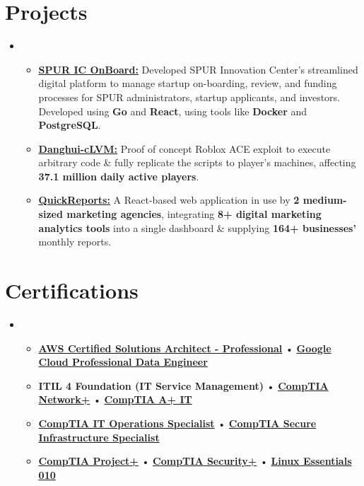 \documentclass[letterpaper,11pt]{article}
\newcommand{\cvitem}[1]{
  \item\small{
    {#1\vspace{-2pt}}
  }
}
\newcommand{\cvheadingstart}{\begin{itemize}[leftmargin=0in, label={}]}
\newcommand{\cvheadingend}{\end{itemize}}
\newcommand{\cvitemstart}{\begin{itemize}\justifying}
\newcommand{\cvitemend}{\end{itemize}\vspace{-5pt}}
\begin{document}
\section{Projects}
\cvheadingstart
\item
\cvitemstart
  \cvitem{\textbf{\href{https://github.com/KonferCA/SPUR}{SPUR IC OnBoard:}} Developed SPUR Innovation Center's streamlined digital platform to manage startup on-boarding, review, and funding processes for SPUR administrators, startup applicants, and investors. Developed using \textbf{Go} and \textbf{React}, using tools like \textbf{Docker} and \textbf{PostgreSQL}.}
  \vspace{6pt}
  \cvitem{\textbf{\href{https://github.com/AmirAgassi/Danghui-LVM}{Danghui-cLVM:}} Proof of concept Roblox ACE exploit to execute arbitrary code \& fully replicate the scripts to player's machines, affecting \textbf{37.1 million daily active players}.}
  \vspace{6pt}
  \cvitem{\textbf{\href{https://quickreports.me}{QuickReports:}} A React-based web application in use by \textbf{2 medium-sized marketing agencies}, integrating \textbf{8+ digital marketing analytics tools} into a single dashboard \& supplying \textbf{164+ businesses'} monthly reports.}
\cvitemend
\cvheadingend
\section{Certifications}
\cvheadingstart
\item
\cvitemstart
  \cvitem{
    \textbf{\href{https://cp.certmetrics.com/amazon/en/public/verify/credential/2LC36B3CWM411J3K}{AWS Certified Solutions Architect - Professional}} •
    \textbf{\href{https://www.credly.com/badges/c9811ec9-a04e-439f-a1bf-f4e18f11c6ee/public_url}{Google Cloud Professional Data Engineer}}
  }
  \cvitem{
    \textbf{ITIL 4 Foundation (IT Service Management)} •
    \textbf{\href{https://www.credly.com/badges/438afda8-6dca-4ad4-94db-0d44baf82fd6/public_url}{CompTIA Network+}} •
    \textbf{\href{https://www.credly.com/badges/f474c77c-bbcf-4327-aa37-3dd99da3ba62/public_url}{CompTIA A+ IT}}
  }
  \cvitem{
    \textbf{\href{https://www.credly.com/badges/e4f89ad1-2f0d-4ccd-bc21-3312d23b96b5/public_url}{CompTIA IT Operations Specialist}} •
    \textbf{\href{https://www.credly.com/badges/3f2de8e5-ed39-42da-a8a3-38574b833b71/public_url}{CompTIA Secure Infrastructure Specialist}}
  }
  \cvitem{
    \textbf{\href{https://www.credly.com/badges/eb621d7d-a8c0-4233-b246-907323b95429/public_url}{CompTIA Project+}} •
    \textbf{\href{https://www.credly.com/badges/ddb1f2a4-4e5d-4f97-bc55-ff52a9ade614/public_url}{CompTIA Security+}} •
    \textbf{\href{https://cs.lpi.org/caf/Xamman/certification/verify/LPI000645485/j6l5zdd7sf}{Linux Essentials 010}}
  }
\cvitemend
\cvheadingend
\end{document}
